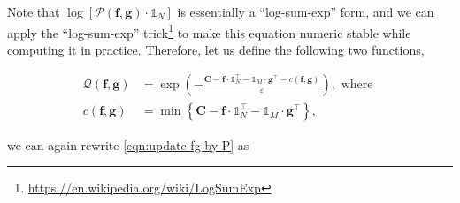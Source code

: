 Note that $\log \left[\mathcal{P}(\mathbf{f}, \mathbf{g})\cdot \mathbb{1}_N\right]$
is essentially a ``log-sum-exp'' form, and we can apply the ``log-sum-exp'' trick\footnote{
  \url{https://en.wikipedia.org/wiki/LogSumExp}
} to make this equation numeric stable while computing it in practice.
Therefore, let us define the following two functions,

\begin{equation}\label{eqn:function-c-and-Q}
  \begin{aligned}
    \mathcal{Q} \left(\mathbf{f}, \mathbf{g}\right)
     & = \exp \left(
    - \frac{
      \mathbf{C} - \mathbf{f} \cdot \mathbb{1}_N^\top - \mathbb{1}_M \cdot \mathbf{g}^\top
      - c \left(\mathbf{f}, \mathbf{g}\right)
    }{\varepsilon}
    \right), \text{ where }                                                                                        \\
    c \left(\mathbf{f}, \mathbf{g}\right)
     & = \min \left\{\mathbf{C} - \mathbf{f} \cdot \mathbb{1}_N^\top - \mathbb{1}_M \cdot \mathbf{g}^\top\right\},
  \end{aligned}
\end{equation}


we can again rewrite \cref{eqn:update-fg-by-P} as

